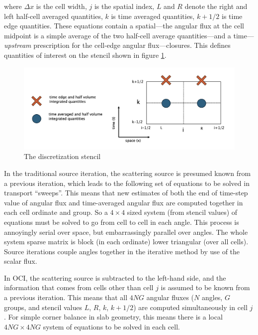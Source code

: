 %
where $\Delta x$ is the cell width, $j$ is the spatial index, $L$ and $R$ denote the right and left half-cell averaged quantities, $k$ is time averaged quantities, $k+1/2$ is time edge quantities.
These equations contain a spatial---the angular flux at the cell midpoint is a simple average of the two half-cell average quantities---and a time---\textit{upstream} prescription for the cell-edge angular flux---closures.
This defines quantities of interest on the stencil shown in figure \ref{fig:stencil}.

\begin{figure}[!htb]
    \centering
    \includegraphics[width=\textwidth]{figures/stencil.png}
    \caption{The discretization stencil}
    \label{fig:stencil}
\end{figure}


In the traditional source iteration, the scattering source is presumed known from a previous iteration, which leads to the following set of equations to be solved in transport ``sweeps''.
This means that new estimates of both the end of time-step value of angular flux and time-averaged angular flux are computed together in each cell ordinate and group. 
So a $4\times4$ sized system (from stencil values) of equations must be solved to go from cell to cell in each angle.
This process is annoyingly serial over space, but embarrassingly parallel over angles.
The whole system sparse matrix is block (in each ordinate) lower triangular (over all cells).
Source iterations couple angles together in the iterative method by use of the scalar flux.

In OCI, the scattering source is subtracted to the left-hand side, and the information that comes from cells other than cell $j$ is assumed to be known from a previous iteration.
This means that all $4NG$ angular fluxes ($N$ angles, $G$ groups, and stencil values $L$, $R$, $k$, $k+1/2$) are computed simultaneously in cell $j$.
For simple corner balance in slab geometry, this means there is a local $4NG \times 4NG$ system of equations to be solved in each cell.


